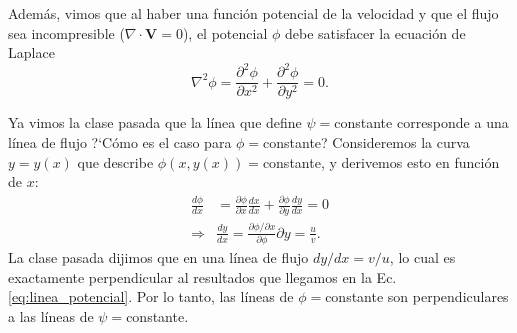 Además, vimos que al haber una función potencial de la velocidad y que el flujo sea incompresible ($\nabla\cdot\mathbf{V}=0$), el potencial $\phi$ debe satisfacer la ecuación de Laplace
%
\begin{equation}\label{eq:pot_laplace}
\nabla^2\phi = \frac{\partial^2 \phi}{\partial x^2} + \frac{\partial^2 \phi}{\partial y^2} = 0.
\end{equation}

Ya vimos la clase pasada que la línea que define $\psi=$constante corresponde a una línea de flujo \mbox{?`}Cómo es el caso para $\phi=$constante?
Consideremos la curva $y=y(x)$ que describe $\phi(x,y(x))=$constante, y derivemos esto en función de $x$:
%
\begin{align}\label{eq:linea_potencial}
\frac{d\phi}{dx} &= \frac{\partial\phi}{\partial x}\frac{dx}{dx} + \frac{\partial\phi}{\partial y} \frac{dy}{dx} = 0\nonumber\\
\Rightarrow &\frac{dy}{dx} = \frac{\partial\phi/\partial x}{\partial\phi}{\partial y} = \frac{u}{v}.
\end{align}
%
La clase pasada dijimos que en una línea de flujo $dy/dx=v/u$, lo cual es exactamente perpendicular al resultados que llegamos en la Ec. \eqref{eq:linea_potencial}.
Por lo tanto, las líneas de $\phi=$constante son perpendiculares a las líneas de $\psi=$constante.

